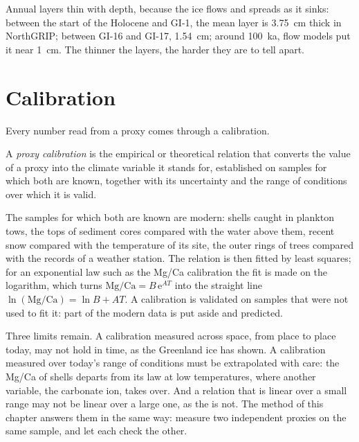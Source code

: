 Annual layers thin with depth, because the ice flows and spreads as it sinks: between the start of
the Holocene and GI-1, the mean layer is \qty{3.75}{cm} thick in NorthGRIP; between GI-16 and
GI-17, \qty{1.54}{cm}; around \qty{100}{ka}, flow models put it near \qty{1}{cm}. The thinner the layers, the harder
they are to tell apart.

\section{Calibration}\label{sec:b2:climate-proxies:calibration}

Every number read from a proxy comes through a calibration.

\begin{definition}\label{def:b2:climate-proxies:calibration}
A \emph{proxy calibration} is the empirical or theoretical relation that
converts the value of a proxy into the climate variable it stands for, established on samples for
which both are known, together with its uncertainty and the range of conditions over which it is
valid.
\end{definition}

The samples for which both are known are modern: shells caught in plankton tows, the tops of sediment cores compared with the water above them, recent snow compared with the
temperature of its site, the outer rings of trees compared with the records of a weather station.
The relation is then fitted by least squares; for an exponential law such as the Mg/Ca
calibration the fit is made on the logarithm, which turns $\text{Mg/Ca} = B\,\mathrm{e}^{AT}$ into
the straight line $\ln(\text{Mg/Ca}) = \ln B + AT$. A calibration is validated on samples that
were not used to fit it: part of the modern data is put aside and predicted.

Three limits remain. A calibration measured across space, from place to place today, may not hold
in time, as the Greenland ice has shown. A calibration measured over today's range of conditions
must be extrapolated with care: the Mg/Ca of shells departs from its law at low temperatures, where
another variable, the carbonate ion, takes over. And a relation that is linear over a small range
may not be linear over a large one, as the  is not. The method of this chapter
answers them in the same way: measure two independent proxies on the same sample, and let each
check the other.

